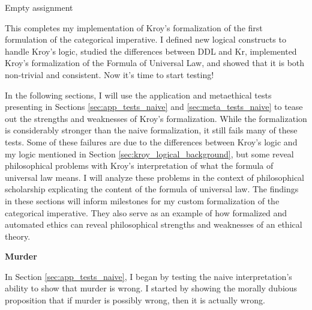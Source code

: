 \begin{isabellebody}
{  Empty assignment\color{black}%
}%
\endisatagproof
{\isafoldproof}%
%
\isadelimproof
%
\endisadelimproof
%
\begin{isamarkuptext}%
This completes my implementation of Kroy's formalization of the first formulation of the 
categorical imperative. I defined new logical constructs to handle Kroy's logic, studied the differences
between DDL and Kr, implemented Kroy's formalization of the Formula of Universal Law, and showed 
that it is both non-trivial and consistent. Now it's time to start testing!%
\end{isamarkuptext}\isamarkuptrue%
%
\isadelimdocument
%
\endisadelimdocument
%
\isatagdocument
%
\isamarkuptrue%
%
\endisatagdocument
{\isafolddocument}%
%
\isadelimdocument
%
\endisadelimdocument
%
\begin{isamarkuptext}%
In the following sections, I will use the application and metaethical tests presenting in Sections \ref{sec:app_tests_naive} and \ref{sec:meta_tests_naive}
        to tease out the strengths and weaknesses of Kroy's formalization. While the formalization is considerably
        stronger than the naive formalization, it still fails many of these tests. Some of these failures 
        are due to the differences between Kroy's logic and my logic mentioned in Section \ref{sec:kroy_logical_background}, but some 
        reveal philosophical problems with Kroy's interpretation of what the formula of universal law means. 
        I will analyze these problems in the context of philosophical scholarship explicating the content 
        of the formula of universal law. The findings in these sections will inform milestones for my
        custom formalization of the categorical imperative. They also serve as an example of how formalized
        and automated ethics can reveal philosophical strengths and weaknesses of an ethical theory.%
\end{isamarkuptext}\isamarkuptrue%
%
\begin{isamarkuptext}%
\textbf{Murder}%
\end{isamarkuptext}\isamarkuptrue%
%
\begin{isamarkuptext}%
In Section \ref{sec:app_tests_naive}, I began by testing the naive interpretation's ability to show that murder 
is wrong. I started by showing the morally dubious proposition that if murder is possibly wrong, then 
it is actually wrong.%
\end{isamarkuptext}\isamarkuptrue%
\isamarkupfalse%

\end{isabellebody}
